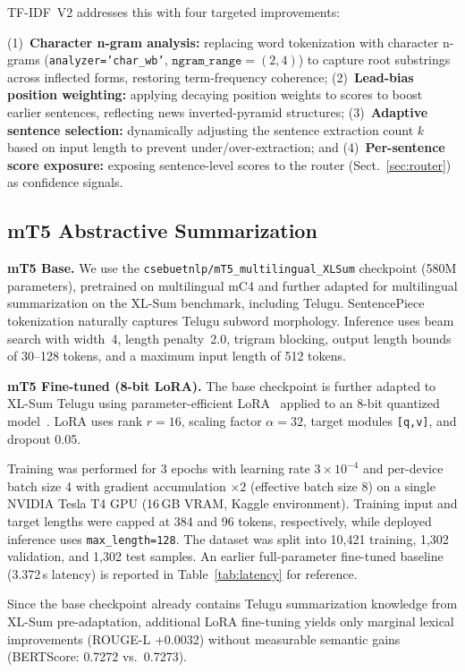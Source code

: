\documentclass[runningheads]{llncs}
\begin{document}
TF-IDF~V2 addresses this with four targeted improvements:

(1)~\textbf{Character n-gram analysis:} replacing word tokenization with character n-grams (\texttt{analyzer='char\_wb'}, $\texttt{ngram\_range}=(2,4)$) to capture root substrings across inflected forms, restoring term-frequency coherence; (2)~\textbf{Lead-bias position weighting:} applying decaying position weights to scores to boost earlier sentences, reflecting news inverted-pyramid structures; (3)~\textbf{Adaptive sentence selection:} dynamically adjusting the sentence extraction count $k$ based on input length to prevent under/over-extraction; and (4)~\textbf{Per-sentence score exposure:} exposing sentence-level scores to the router (Sect.~\ref{sec:router}) as confidence signals.

\subsection{mT5 Abstractive Summarization}
\label{sec:mt5}

\textbf{mT5 Base.}
We use the
\texttt{csebuetnlp/mT5\_multilingual\_XLSum}
checkpoint (580M parameters), pretrained on multilingual
mC4 and further adapted for multilingual summarization on
the XL-Sum benchmark, including Telugu.
SentencePiece tokenization naturally captures Telugu
subword morphology.
Inference uses beam search with width~4, length
penalty~2.0, trigram blocking, output length bounds of
30--128 tokens, and a maximum input length of 512 tokens.

\textbf{mT5 Fine-tuned (8-bit LoRA).}
The base checkpoint is further adapted to XL-Sum Telugu
using parameter-efficient LoRA~\cite{hu2022lora}
applied to an 8-bit quantized model~\cite{dettmers2022int8}.
LoRA uses rank $r=16$, scaling factor $\alpha=32$,
target modules \texttt{[q,v]}, and dropout 0.05.

Training was performed for 3 epochs with learning rate
$3\times10^{-4}$ and per-device batch size 4 with
gradient accumulation $\times 2$ (effective batch size 8)
on a single NVIDIA Tesla T4 GPU (16\,GB VRAM, Kaggle
environment). Training input and target lengths were
capped at 384 and 96 tokens, respectively, while deployed
inference uses \texttt{max\_length=128}. The dataset was
split into 10,421 training, 1,302 validation, and 1,302
test samples. An earlier full-parameter fine-tuned
baseline (3.372\,s latency) is reported in
Table~\ref{tab:latency} for reference.

Since the base checkpoint already contains Telugu
summarization knowledge from XL-Sum pre-adaptation,
additional LoRA fine-tuning yields only marginal lexical
improvements (ROUGE-L +0.0032) without measurable
semantic gains (BERTScore: 0.7272 vs.\ 0.7273).
\end{document}
